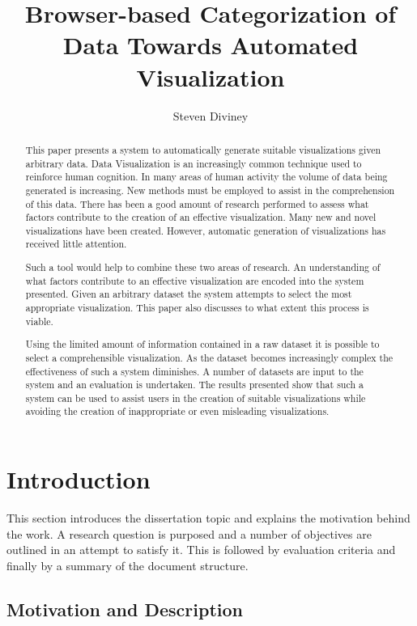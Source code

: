 \documentclass[a4paper, 11pt, titlepage, onehalfspacing]{article}
\title{Browser-based Categorization of Data Towards Automated Visualization}
\author{Steven Diviney}
\begin{document}
\onehalfspacing
\maketitle

\newpage

\begin{abstract}
This paper presents a system to automatically generate suitable visualizations given arbitrary data. Data Visualization is an increasingly common technique used to reinforce human cognition. In many areas of human activity the volume of data being generated is increasing. New methods must be employed to assist in the comprehension of this data. There has been a good amount of research performed to assess what factors contribute to the creation of an effective visualization. Many new and novel visualizations have been created. However, automatic generation of visualizations has received little attention.

Such a tool would help to combine these two areas of research. An understanding of what factors contribute to an effective visualization are encoded into the system presented. Given an arbitrary dataset the system attempts to select the most appropriate visualization. This paper also discusses to what extent this process is viable.

Using the limited amount of information contained in a raw dataset it is possible to select a comprehensible visualization. As the dataset becomes increasingly complex the effectiveness of such a system diminishes. A number of datasets are input to the system and an evaluation is undertaken. The results presented show that such a system can be used to assist users in the creation of suitable visualizations while avoiding the creation of inappropriate or even misleading visualizations.
\end{abstract}

\tableofcontents

\newpage
 
\section{Introduction} 
This section introduces the dissertation topic and explains the motivation behind the work. A research question is purposed and a number of objectives are outlined in an attempt to satisfy it. This is followed by evaluation criteria and finally by a summary of the document structure.
 
\subsection{Motivation and Description} 
\end{document}
